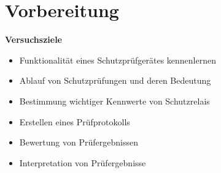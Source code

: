 \chapter{Vorbereitung}
\textbf{Versuchsziele}
\begin{itemize}
	\item Funktionalität eines Schutzprüfgerätes kennenlernen
	\item Ablauf von Schutzprüfungen und deren Bedeutung
	\item Bestimmung wichtiger Kennwerte von Schutzrelais
	\item Erstellen eines Prüfprotokolls
	\item Bewertung von Prüfergebnissen
	\item Interpretation von Prüfergebnisse
\end{itemize}


